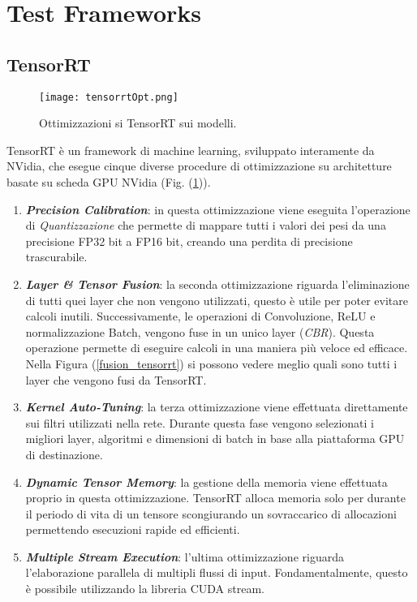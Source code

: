 \section{Test Frameworks}
\subsection{TensorRT}
\begin{figure}
    \centering
    \texttt{[image: tensorrtOpt.png]}
    \centering
    \caption{Ottimizzazioni si TensorRT sui modelli.}
    \label{tensorrt}
\end{figure}
TensorRT è un framework di machine learning, sviluppato interamente da 
NVidia, che esegue cinque diverse procedure di ottimizzazione su architetture 
basate su scheda GPU NVidia (Fig. (\ref{tensorrt})). 
\begin{enumerate}
    \item {\bfseries{\emph{Precision Calibration}}}: in questa ottimizzazione viene eseguita 
    l'operazione di \emph{Quantizzazione} che permette di mappare tutti i valori 
    dei pesi da una precisione FP32 bit a FP16 bit, creando una perdita 
    di precisione trascurabile.
    \item {\bfseries{\emph{Layer \& Tensor Fusion}}}: la seconda ottimizzazione riguarda l'eliminazione 
    di tutti quei layer che non vengono utilizzati, questo è 
    utile per poter evitare calcoli inutili. Successivamente, le operazioni 
    di Convoluzione, ReLU e normalizzazione Batch, vengono fuse in un 
    unico layer (\emph{CBR}). Questa operazione permette di eseguire calcoli 
    in una maniera più veloce ed efficace. Nella Figura (\ref{fusion_tensorrt}) si possono 
    vedere meglio quali sono tutti i layer che vengono fusi da TensorRT.
    \item {\bfseries{\emph{Kernel Auto-Tuning}}}: la terza ottimizzazione viene effettuata direttamente 
    sui filtri utilizzati nella rete. Durante questa fase vengono 
    selezionati i migliori layer, algoritmi e dimensioni di batch in base alla 
    piattaforma GPU di destinazione.
    \item {\bfseries{\emph{Dynamic Tensor Memory}}}: la gestione della memoria viene effettuata 
    proprio in questa ottimizzazione. TensorRT alloca memoria 
    solo per durante il periodo di vita di un tensore scongiurando un 
    sovraccarico di allocazioni permettendo esecuzioni rapide ed efficienti.
    \item {\bfseries{\emph{Multiple Stream Execution}}}: l'ultima ottimizzazione riguarda l'elaborazione 
    parallela di multipli flussi di input. Fondamentalmente, 
    questo è possibile utilizzando la libreria CUDA stream.
\end{enumerate}
